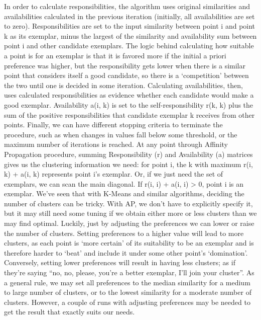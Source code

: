 \documentclass[a4paper, 12pt]{article}
\begin{document}
In order to calculate responsibilities, the algorithm uses original similarities and availabilities calculated in the previous iteration (initially, all availabilities are set to zero). Responsibilities are set to the input similarity between point i and point k as its exemplar, minus the largest of the similarity and availability sum between point i and other candidate exemplars. The logic behind calculating how suitable a point is for an exemplar is that it is favored more if the initial a priori preference was higher, but the responsibility gets lower when there is a similar point that considers itself a good candidate, so there is a ‘competition’ between the two until one is decided in some iteration.
Calculating availabilities, then, uses calculated responsibilities as evidence whether each candidate would make a good exemplar. Availability a(i, k) is set to the self-responsibility r(k, k) plus the sum of the positive responsibilities that candidate exemplar k receives from other points.
Finally, we can have different stopping criteria to terminate the procedure, such as when changes in values fall below some threshold, or the maximum number of iterations is reached. At any point through Affinity Propagation procedure, summing Responsibility (r) and Availability (a) matrices gives us the clustering information we need: for point i, the k with maximum r(i, k) + a(i, k) represents point i’s exemplar. Or, if we just need the set of exemplars, we can scan the main diagonal. If r(i, i) + a(i, i) > 0, point i is an exemplar.
We’ve seen that with K-Means and similar algorithms, deciding the number of clusters can be tricky. With AP, we don’t have to explicitly specify it, but it may still need some tuning if we obtain either more or less clusters than we may find optimal. Luckily, just by adjusting the preferences we can lower or raise the number of clusters. Setting preferences to a higher value will lead to more clusters, as each point is ‘more certain’ of its suitability to be an exemplar and is therefore harder to ‘beat’ and include it under some other point’s ‘domination’. Conversely, setting lower preferences will result in having less clusters; as if they’re saying “no, no, please, you’re a better exemplar, I’ll join your cluster”. As a general rule, we may set all preferences to the median similarity for a medium to large number of clusters, or to the lowest similarity for a moderate number of clusters. However, a couple of runs with adjusting preferences may be needed to get the result that exactly suits our needs.
\end{document}
